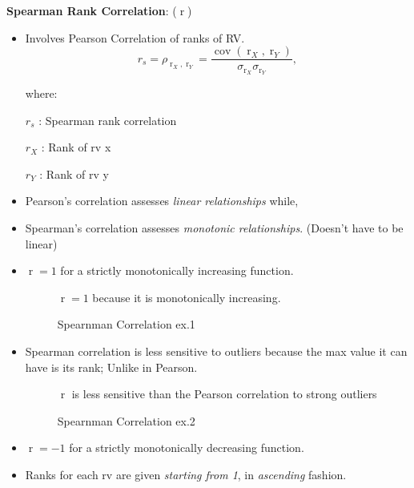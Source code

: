 \documentclass[	DIV=calc,%
paper=a4,%
fontsize=11pt,%
twocolumn]{scrartcl} %
\newcommand{\formdesc}[1]{\noindent\textbf{#1}}
\begin{document}
\formdesc{Spearman Rank Correlation}: ($\operatorname{r}$)
\begin{itemize}
	\item Involves Pearson Correlation of ranks of RV.
	\begin{equation}
		{\displaystyle r_{s}=\rho _{\operatorname {r} _{X},\operatorname {r} _{Y}}={\frac {\operatorname {cov} (\operatorname {r} _{X},\operatorname {r} _{Y})}{\sigma _{\operatorname {r} _{X}}\sigma _{\operatorname {r} _{Y}}}},}
	\end{equation}

where:

$r_{s}$ : Spearman rank correlation

${r} _{X}$ : Rank of rv x

${r} _{Y}$ :  Rank of rv y

\item Pearson's correlation assesses \emph{linear relationships} while,
\item Spearman's correlation assesses \emph{monotonic relationships}. (Doesn't have to be linear)
\item $\operatorname{r}=1$ for a strictly monotonically increasing function.

\begin{figure}[ht!]
	\centering
	\graphicspath{ {images/math/} }
	\caption{Spearnman Correlation ex.1}
	{\vspace{10px} \small{$\operatorname{r}=1$ because it is monotonically increasing.}}
	
\end{figure}

\break

\item Spearman correlation is less sensitive to outliers because the max value it can have is its rank; Unlike in Pearson.

\begin{figure}[ht!]
	\centering
	\graphicspath{ {images/math/} }
	\caption{Spearnman Correlation ex.2}
	{\vspace{10px}\small{$\operatorname{r}$ is less sensitive than the Pearson correlation to strong outliers}}
	
\end{figure}

\item $\operatorname{r}=-1$ for a strictly monotonically decreasing function.
\item Ranks for each rv are given \emph{starting from 1}, in \emph{ascending} fashion.


\end{itemize}
\end{document}
